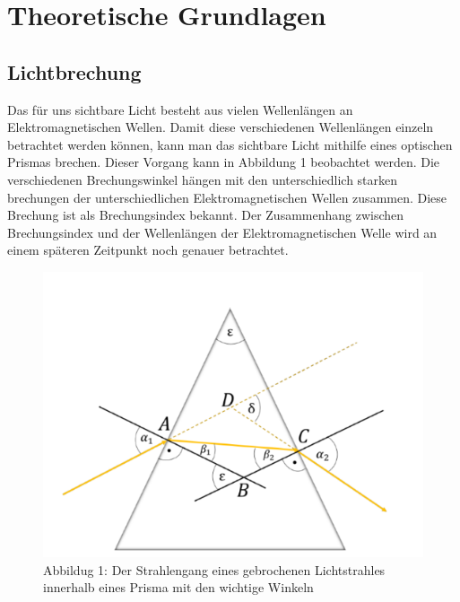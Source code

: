 \section{Theoretische Grundlagen}


\subsection{Lichtbrechung}
Das für uns sichtbare Licht besteht aus vielen Wellenlängen an 
Elektromagnetischen Wellen. Damit diese verschiedenen Wellenlängen 
einzeln betrachtet werden können, kann man das sichtbare Licht 
mithilfe eines optischen Prismas brechen. Dieser Vorgang kann in 
Abbildung 1 beobachtet werden. Die verschiedenen Brechungswinkel 
hängen mit den unterschiedlich starken brechungen der 
unterschiedlichen Elektromagnetischen Wellen zusammen. 
Diese Brechung ist als Brechungsindex bekannt. Der Zusammenhang 
zwischen Brechungsindex und der Wellenlängen der 
Elektromagnetischen Welle wird an einem späteren Zeitpunkt noch 
genauer betrachtet.
\begin{figure}[!htb]
\centering
\includegraphics{Bilder/Strahlengang O2.png}
\caption{Abbildug 1: Der Strahlengang eines gebrochenen Lichtstrahles innerhalb eines Prisma mit den wichtige Winkeln}
\end{figure}

